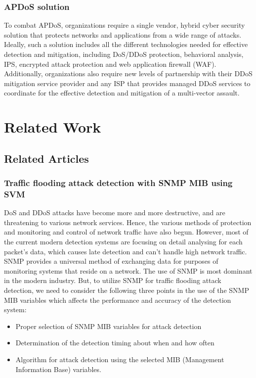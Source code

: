 \documentclass{report}
\begin{document}
\subsection {APDoS solution}

 \hfill \break To combat \gls{APDoS}, organizations require a single vendor, hybrid cyber security solution that protects networks and applications from a wide range of attacks. Ideally, such a solution \cite{APDoSSolution} includes all the different technologies needed for effective detection and mitigation, including \gls{DoS}/\gls{DDoS} protection, behavioral analysis, \gls{IPS}, encrypted attack protection and web application firewall (WAF). Additionally, organizations also require new levels of partnership with their \gls{DDoS} mitigation service provider and any \gls{ISP} that provides managed \gls{DDoS} services to coordinate for the effective detection and mitigation of a multi-vector assault.

\newpage
\chapter {Related Work}
\section {Related Articles}
\subsection {Traffic flooding attack detection with SNMP MIB using SVM}
\gls{DoS} and \gls{DDoS} attacks have become more and more destructive, and are threatening to various network services. Hence, the various methods of protection and monitoring and control of network traffic have also begun.
However, most of the current modern detection systems are focusing on detail analysing for each packet’s data, which causes late detection and can’t handle high network traffic.
  \hfill \break
 \gls{SNMP}\cite{snmp}  provides a universal method of exchanging data for purposes of monitoring systems that reside on a network. The use of  \gls{SNMP} is most dominant in the modern industry. But, to utilize  \gls{SNMP} for traffic flooding attack detection, we need to consider the following three points in the use of the  \gls{SNMP} MIB variables which affects the performance and accuracy of the detection system:
\begin{itemize}
\item Proper selection of  \gls{SNMP} MIB variables for attack detection
\item Determination of the detection timing about when and how often
\item Algorithm for attack detection using the selected MIB (Management Information Base) variables.
\end{itemize}
  \hfill \break
\end{document}
